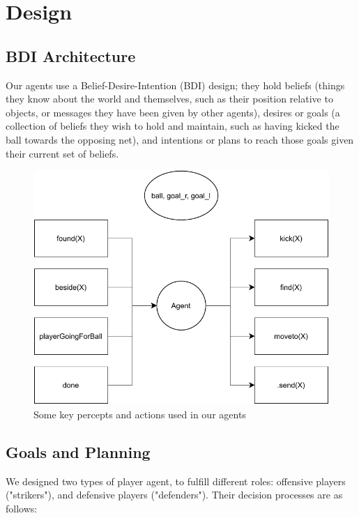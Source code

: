\documentclass[conference]{IEEEtran}
\begin{document}
\section{Design}

\subsection{BDI Architecture}
Our agents use a Belief-Desire-Intention (BDI) design; they hold beliefs (things they know about the world and themselves, such as their position relative to objects, or messages they have been given by other agents), desires or goals (a collection of beliefs they wish to hold and maintain, such as having kicked the ball towards the opposing net), and intentions or plans to reach those goals given their current set of beliefs. 
\begin{figure}[h]
	\centering
	\includegraphics[scale=0.5]{fig/percepts-and-actions.pdf}
	\caption{Some key percepts and actions used in our agents}
	\label{percepts-actions}
\end{figure}


\subsection{Goals and Planning}

We designed two types of player agent, to fulfill different roles: offensive players ("strikers"), and defensive players ("defenders"). Their decision processes are as follows:
\end{document}
